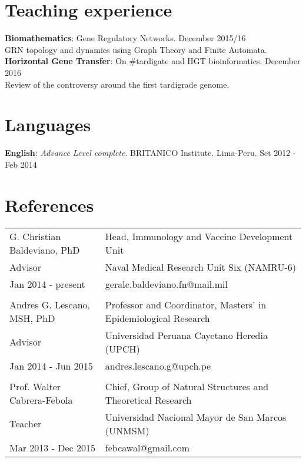 \documentclass[margin,line]{res}
\begin{document}
\begin{resume}
\section{\sc Teaching experience}
{\bf Biomathematics}: Gene Regulatory Networks. \hfill {December 2015/16}\\ GRN topology and dynamics using Graph Theory and Finite Automata. \\[4pt] %
{\bf Horizontal Gene Transfer}: On \#tardigate and HGT bioinformatics. \hfill {December 2016}\\ 
Review of the controversy around the first tardigrade genome. \\


\section{\sc Languages}
{\bf English}: {\em Advance Level complete}. BRITANICO Institute. Lima-Peru. \hfill {Set 2012 - Feb 2014} \\

\section{\sc References }

\begin{tabular}{ l l }
	G. Christian Baldeviano, PhD & Head, Immunology and Vaccine Development Unit \\
	Advisor & Naval Medical Research Unit Six (NAMRU-6)\\
	Jan 2014 - present & geralc.baldeviano.fn@mail.mil\\
	&\\
	Andres G. Lescano, MSH, PhD & Professor and Coordinator, Masters' in Epidemiological Research\\
	Advisor & Universidad Peruana Cayetano Heredia (UPCH)\\
	Jan 2014 - Jun 2015 & andres.lescano.g@upch.pe\\
	&\\
	Prof. Walter Cabrera-Febola & Chief, Group of Natural Structures and Theoretical Research \\
	Teacher & Universidad Nacional Mayor de San Marcos (UNMSM)\\
	Mar 2013 - Dec 2015 & febcawal@gmail.com\\	
\end{tabular}


\end{resume}
\end{document}
